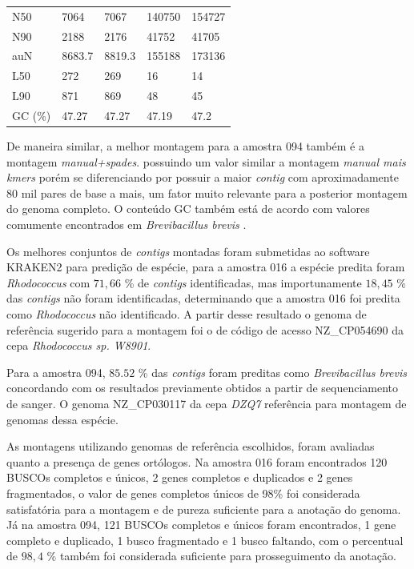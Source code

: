 \begin{table}[htb]
{\begin{tabular}{lllll}
        N50                                          & 7064    & 7067    & 140750  & 154727  \\
        N90                                          & 2188    & 2176    & 41752   & 41705   \\
        auN                                          & 8683.7  & 8819.3  & 155188  & 173136  \\
        L50                                          & 272     & 269     & 16      & 14      \\
        L90                                          & 871     & 869     & 48      & 45      \\
        GC (\%)                                      & 47.27   & 47.27   & 47.19   & 47.2   \\
	\bottomrule
    \end{tabular}
	}{%
	\centering
	  }
\end{table}



De maneira similar, a melhor montagem para a amostra 094 também é a montagem \textit{manual+spades}.
possuindo um valor similar a montagem \textit{manual mais kmers} porém se diferenciando por possuir a maior \textit{contig}
com aproximadamente 80 mil pares de base a mais, um fator muito relevante para a posterior montagem do genoma completo.
O conteúdo GC também está de acordo com valores comumente encontrados em \textit{Brevibacillus brevis} \cite{nakamura1991bacillus}.


Os melhores conjuntos de \textit{contigs} montadas foram submetidas ao software KRAKEN2 para predição de espécie,
para a amostra 016 a espécie predita foram \textit{Rhodococcus} com $71,66$ \% de \textit{contigs} identificadas, mas importunamente
$18,45$ \% das \textit{contigs} não foram identificadas, determinando que a amostra 016 foi predita como \textit{Rhodococcus}
não identificado. A partir desse resultado o genoma de referência sugerido para a montagem foi o de código
de acesso NZ\_CP054690 da cepa \textit{Rhodococcus sp. W8901}. 

Para a amostra 094, $85.52$ \% das \textit{contigs} foram preditas como \textit{Brevibacillus brevis}
concordando com os resultados previamente obtidos a partir de sequenciamento de sanger. O genoma NZ\_CP030117
da cepa \textit{DZQ7} referência para montagem de genomas dessa espécie.

As montagens utilizando genomas de referência escolhidos, foram avaliadas quanto a presença de genes 
ortólogos. Na amostra 016 foram encontrados 120 BUSCOs completos e únicos, 2 genes completos e duplicados e 2 genes fragmentados,
 o valor de genes completos únicos de 98\% foi considerada satisfatória para a montagem e de pureza suficiente para
a anotação do genoma. Já na amostra 094, 121 BUSCOs completos e únicos foram encontrados, 1 gene completo e duplicado, 1 busco fragmentado
e 1 busco faltando, com o percentual de $98,4$ \% também foi considerada suficiente para prosseguimento da anotação.

